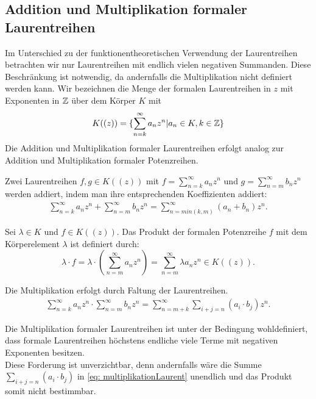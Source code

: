 \subsection{Addition und Multiplikation formaler Laurentreihen}\label{RechnenMitLaurentreihen}
%
%
Im Unterschied zu der funktionentheoretischen Verwendung der Laurentreihen betrachten wir nur Laurentreihen mit endlich vielen negativen Summanden. Diese Beschränkung ist notwendig, da andernfalls die Multiplikation nicht definiert werden kann.
Wir bezeichnen die Menge der formalen Laurentreihen in $z$ mit Exponenten in $\mathbb{Z}$ über dem Körper $K$ mit
\begin{equation*} %
K((z)) = \lbrace \sum_{n =k}^{\infty} a_nz^n \vert a_n \in K, k \in \Z\rbrace
\end{equation*} 
Die Addition und Multiplikation formaler Laurentreihen erfolgt analog zur Addition und Multiplikation formaler Potenzreihen.
\begin{defn}\label{AdditionLreihen}
Zwei Laurentreihen $f, g \in K((z))$ mit $f = \sum_{n=k}^\infty a_n z^n$ und $g= \sum_{n=m}^\infty b_n z^n$ werden addiert, indem man ihre entsprechenden Koeffizienten addiert: 
%
\begin{eqnarray}
\sum_{n=k}^\infty a_n z^n  +  \sum_{n=m}^\infty b_n z^n = \sum_{n = min(k, m)}^{\infty}(a_n + b_n) z^n.
\end{eqnarray}
\end{defn}
%
%
% 
%
\begin{defn}\label{MultiplikationKLreihen}
Sei $\lambda \in K$ und $f \in K\left(\left( z \right)\right)$. Das Produkt der formalen Potenzreihe $f$ mit dem Körperelement $\lambda$ ist definiert durch:
\[\lambda\cdot f = \lambda\cdot \left(\sum_{n=m}^{\infty}a_nz^n\right) = \sum_{n=m}^{\infty} \lambda a_nz^n \in K\left(\left( z\right)\right). 
\]
\end{defn}
%
%
%
\begin{defn}\label{MultiplikationLreihen}
Die Multiplikation erfolgt durch Faltung der Laurentreihen.
\begin{eqnarray}
\label{eq: multiplikationLaurent}
\sum_{n=k}^{\infty} a_n z^n  \cdot  \sum_{n=m}^{\infty} b_n z^n = \sum_{n = m+k}^{\infty}\sum_{i+j=n}^{}\left(a_i \cdot b_j\right) z^n. 
\end{eqnarray}
%

\end{defn}
%
\begin{bem}
Die Multiplikation formaler Laurentreihen ist unter der Bedingung wohldefiniert, dass formale Laurentreihen höchstens endliche viele Terme mit negativen Exponenten besitzen. \\
Diese Forderung ist unverzichtbar, denn andernfalls wäre die Summe $\sum_{i+j=n}^{}\left(a_i \cdot b_j\right)$ in \ref{eq: multiplikationLaurent} unendlich und das Produkt somit nicht bestimmbar.
\end{bem}

